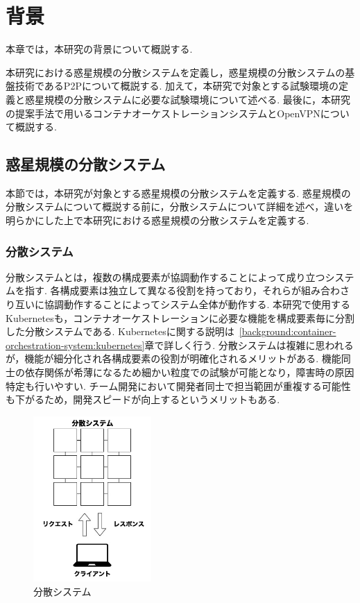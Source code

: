 \chapter{背景}
\label{background}

本章では，本研究の背景について概説する.

本研究における惑星規模の分散システムを定義し，惑星規模の分散システムの基盤技術であるP2Pについて概説する.
加えて，本研究で対象とする試験環境の定義と惑星規模の分散システムに必要な試験環境について述べる.
最後に，本研究の提案手法で用いるコンテナオーケストレーションシステムとOpenVPNについて概説する.

\section{惑星規模の分散システム}
\label{bg:definition}

本節では，本研究が対象とする惑星規模の分散システムを定義する.
惑星規模の分散システムについて概説する前に，分散システムについて詳細を述べ，違いを明らかにした上で本研究における惑星規模の分散システムを定義する.

\subsection{分散システム}
\label{bg:definition:distributed-system}

分散システムとは，複数の構成要素が協調動作することによって成り立つシステムを指す.
各構成要素は独立して異なる役割を持っており，それらが組み合わさり互いに協調動作することによってシステム全体が動作する.
本研究で使用するKubernetesも，コンテナオーケストレーションに必要な機能を構成要素毎に分割した分散システムである.
Kubernetesに関する説明は~\ref{background:container-orchestration-system:kubernetes}章で詳しく行う.
分散システムは複雑に思われるが，機能が細分化され各構成要素の役割が明確化されるメリットがある.
機能同士の依存関係が希薄になるため細かい粒度での試験が可能となり，障害時の原因特定も行いやすい.
チーム開発において開発者同士で担当範囲が重複する可能性も下がるため，開発スピードが向上するというメリットもある.

\begin{figure}[htbp]
\begin{center}
    \includegraphics[width=0.4\textwidth]{./figures/distributed-system.jpg}
    \caption{分散システム}
\end{center}
\end{figure}

